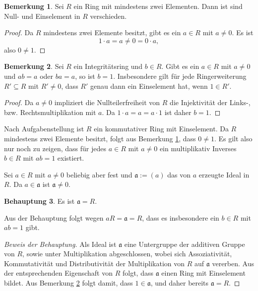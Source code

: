 \documentclass[a4paper,10pt]{article}
\theoremstyle{definition}
\newtheorem{beh}{Behauptung}
\newtheorem{bem}[beh]{Bemerkung}
\newcommand{\mf}[1]{\mathfrak{#1}}
\begin{document}
\begin{bem}\label{bem: 0 neq 1}
 Sei $R$ ein Ring mit mindestens zwei Elementen. Dann ist sind Null- und Einselement in $R$ verschieden.
\end{bem}
\begin{proof}
 Da $R$ mindestens zwei Elemente besitzt, gibt es ein $a \in R$ mit $a \neq 0$. Es ist
 \[
  1 \cdot a = a \neq 0 = 0 \cdot a,
 \]
 also $0 \neq 1$.
\end{proof}

\begin{bem}\label{bem: 1 ohne nullteiler eindeutig}
 Sei $R$ ein Integritätsring und $b \in R$. Gibt es ein $a \in R$ mit $a \neq 0$ und $ab = a$ oder $ba = a$, so ist $b = 1$. Insbesondere gilt für jede Ringerweiterung $R' \subseteq R$ mit $R' \neq 0$, dass $R'$ genau dann ein Einselement hat, wenn $1 \in R'$.
 \begin{proof}
  Da $a \neq 0$ impliziert die Nullteilerfreiheit von $R$ die Injektivität der Links-, bzw. Rechtsmultiplikation mit $a$. Da $1 \cdot a = a = a \cdot 1$ ist daher $b = 1$.
 \end{proof}
\end{bem}

Nach Aufgabenstellung ist $R$ ein kommutativer Ring mit Einselement. Da $R$ mindestens zwei Elemente besitzt, folgt aus Bemerkung \ref{bem: 0 neq 1}, dass $0 \neq 1$. Es gilt also nur noch zu zeigen, dass für jedes $a \in R$ mit $a \neq 0$ ein multiplikativ Inverses $b \in R$ mit $ab = 1$ existiert.

Sei $a \in R$ mit $a \neq 0$ beliebig aber fest und $\mf{a} := (a)$ das von $a$ erzeugte Ideal in $R$. Da $a \in \mf{a}$ ist $\mf{a} \neq 0$.

\begin{beh}
 Es ist $\mf{a} = R$.
\end{beh}

Aus der Behauptung folgt wegen $aR = \mf{a} = R$, dass es insbesondere ein $b \in R$ mit $ab = 1$ gibt.

\begin{proof}[Beweis der Behauptung]
 Als Ideal ist $\mf{a}$ eine Untergruppe der additiven Gruppe von $R$, sowie unter Multiplikation abgeschlossen, wobei sich Assoziativität, Kommutativität und Distributivität der Multiplikation von $R$ auf $\mf{a}$ vererben. Aus der entsprechenden Eigenschaft von $R$ folgt, dass $\mf{a}$ einen Ring mit Einselement bildet. Aus Bemerkung \ref{bem: 1 ohne nullteiler eindeutig} folgt damit, dass $1 \in \mf{a}$, und daher bereits $\mf{a} = R$.
\end{proof}
\end{document}
